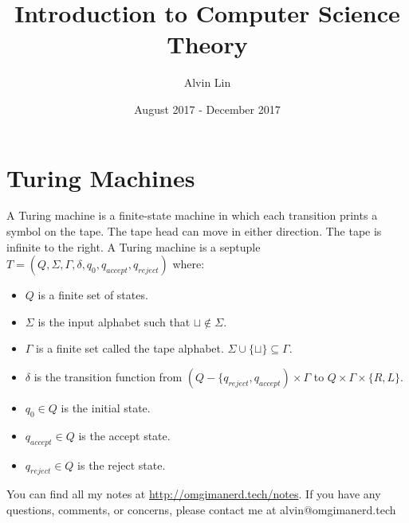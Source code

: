 \documentclass{math}
\title{Introduction to Computer Science Theory}
\author{Alvin Lin}
\date{August 2017 - December 2017}
\begin{document}
\maketitle

\section*{Turing Machines}
A Turing machine is a finite-state machine in which each transition prints a
symbol on the tape. The tape head can move in either direction. The tape is
infinite to the right. A Turing machine is a septuple \( T =
(Q,\Sigma,\Gamma,\delta,q_0,q_{accept},q_{reject}) \) where:
\begin{itemize}
  \item \( Q \) is a finite set of states.
  \item \( \Sigma \) is the input alphabet such that \( \sqcup\notin\Sigma \).
  \item \( \Gamma \) is a finite set called the tape alphabet.
  \( \Sigma\cup\{\sqcup\}\subseteq\Gamma \).
  \item \( \delta \) is the transition function from
    \( (Q-\{q_{reject},q_{accept})\times\Gamma \) to
    \( Q\times\Gamma\times\{R,L\} \).
  \item \( q_0\in Q \) is the initial state.
  \item \( q_{accept}\in Q \) is the accept state.
  \item \( q_{reject}\in Q \) is the reject state.
\end{itemize}

\begin{center}
  You can find all my notes at \url{http://omgimanerd.tech/notes}. If you have
  any questions, comments, or concerns, please contact me at
  alvin@omgimanerd.tech
\end{center}
\end{document}
